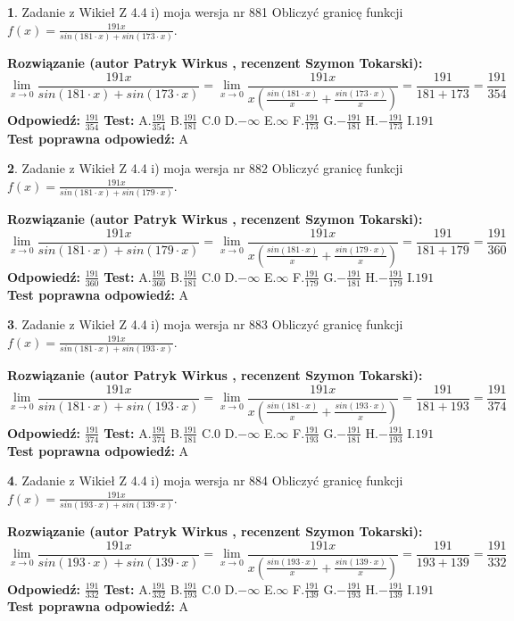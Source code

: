 \documentclass[12pt, a4paper]{article}
\theoremstyle{definition} %
\newtheorem{zad}{}
\newcommand{\zadStart}[1]{\begin{zad}#1\newline}
\newcommand{\zadStop}{\end{zad}}
\newcommand{\rozwStart}[2]{\noindent \textbf{Rozwiązanie (autor #1 , recenzent #2): }\newline}
\newcommand{\rozwStop}{\newline}
\newcommand{\odpStart}{\noindent \textbf{Odpowiedź:}\newline}
\newcommand{\odpStop}{\newline}
\newcommand{\testStart}{\noindent \textbf{Test:}\newline}
\newcommand{\testStop}{\newline}
\newcommand{\kluczStart}{\noindent \textbf{Test poprawna odpowiedź:}\newline}
\newcommand{\kluczStop}{\newline}
\begin{document}
\zadStart{Zadanie z Wikieł Z 4.4 i) moja wersja nr 881}
Obliczyć granicę funkcji $f(x)=\frac{191x}{sin(181\cdot x) +sin(173\cdot x)}$.
\zadStop
\rozwStart{Patryk Wirkus}{Szymon Tokarski}
$$\lim\limits_{x\to 0}\frac{191x}{sin(181\cdot x) +sin(173\cdot x)}=\lim\limits_{x\to 0}\frac{191x}{x(\frac{sin(181\cdot x)}{x}+\frac{sin(173\cdot x)}{x})}=\frac{191}{181+173} = \frac{191}{354}$$
\rozwStop
\odpStart
$\frac{191}{354}$
\odpStop
\testStart
A.$\frac{191}{354}$
B.$\frac{191}{181}$
C.$0$
D.$-\infty$
E.$\infty$
F.$\frac{191}{173}$
G.$-\frac{191}{181}$
H.$-\frac{191}{173}$
I.$191$
\testStop
\kluczStart
A
\kluczStop



\zadStart{Zadanie z Wikieł Z 4.4 i) moja wersja nr 882}
Obliczyć granicę funkcji $f(x)=\frac{191x}{sin(181\cdot x) +sin(179\cdot x)}$.
\zadStop
\rozwStart{Patryk Wirkus}{Szymon Tokarski}
$$\lim\limits_{x\to 0}\frac{191x}{sin(181\cdot x) +sin(179\cdot x)}=\lim\limits_{x\to 0}\frac{191x}{x(\frac{sin(181\cdot x)}{x}+\frac{sin(179\cdot x)}{x})}=\frac{191}{181+179} = \frac{191}{360}$$
\rozwStop
\odpStart
$\frac{191}{360}$
\odpStop
\testStart
A.$\frac{191}{360}$
B.$\frac{191}{181}$
C.$0$
D.$-\infty$
E.$\infty$
F.$\frac{191}{179}$
G.$-\frac{191}{181}$
H.$-\frac{191}{179}$
I.$191$
\testStop
\kluczStart
A
\kluczStop



\zadStart{Zadanie z Wikieł Z 4.4 i) moja wersja nr 883}
Obliczyć granicę funkcji $f(x)=\frac{191x}{sin(181\cdot x) +sin(193\cdot x)}$.
\zadStop
\rozwStart{Patryk Wirkus}{Szymon Tokarski}
$$\lim\limits_{x\to 0}\frac{191x}{sin(181\cdot x) +sin(193\cdot x)}=\lim\limits_{x\to 0}\frac{191x}{x(\frac{sin(181\cdot x)}{x}+\frac{sin(193\cdot x)}{x})}=\frac{191}{181+193} = \frac{191}{374}$$
\rozwStop
\odpStart
$\frac{191}{374}$
\odpStop
\testStart
A.$\frac{191}{374}$
B.$\frac{191}{181}$
C.$0$
D.$-\infty$
E.$\infty$
F.$\frac{191}{193}$
G.$-\frac{191}{181}$
H.$-\frac{191}{193}$
I.$191$
\testStop
\kluczStart
A
\kluczStop



\zadStart{Zadanie z Wikieł Z 4.4 i) moja wersja nr 884}
Obliczyć granicę funkcji $f(x)=\frac{191x}{sin(193\cdot x) +sin(139\cdot x)}$.
\zadStop
\rozwStart{Patryk Wirkus}{Szymon Tokarski}
$$\lim\limits_{x\to 0}\frac{191x}{sin(193\cdot x) +sin(139\cdot x)}=\lim\limits_{x\to 0}\frac{191x}{x(\frac{sin(193\cdot x)}{x}+\frac{sin(139\cdot x)}{x})}=\frac{191}{193+139} = \frac{191}{332}$$
\rozwStop
\odpStart
$\frac{191}{332}$
\odpStop
\testStart
A.$\frac{191}{332}$
B.$\frac{191}{193}$
C.$0$
D.$-\infty$
E.$\infty$
F.$\frac{191}{139}$
G.$-\frac{191}{193}$
H.$-\frac{191}{139}$
I.$191$
\testStop
\kluczStart
A
\kluczStop
\end{document}
